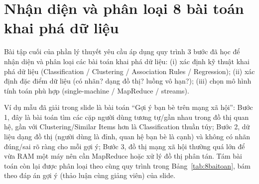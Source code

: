 \documentclass[12pt,a4paper,oneside]{article}
\begin{document}
\section{Nhận diện và phân loại 8 bài toán khai phá dữ liệu}
\label{sec:8baitoan}

Bài tập cuối của phần lý thuyết yêu cầu áp dụng quy trình 3 bước đã học để nhận diện và phân loại các bài toán khai phá dữ liệu: (i) xác định kỹ thuật khai phá dữ liệu (Classification / Clustering / Association Rules / Regression); (ii) xác định đặc điểm dữ liệu (có nhãn? dạng đồ thị? luồng vô hạn?); (iii) chọn mô hình tính toán phù hợp (single-machine / MapReduce / streams).

Ví dụ mẫu đã giải trong slide là bài toán ``Gợi ý bạn bè trên mạng xã hội'': Bước 1, đây là bài toán tìm các cặp người dùng tương tự/gần nhau trong đồ thị quan hệ, gần với Clustering/Similar Items hơn là Classification thuần túy; Bước 2, dữ liệu dạng đồ thị (người dùng là đỉnh, quan hệ bạn bè là cạnh) và không có nhãn đúng/sai rõ ràng cho mỗi gợi ý; Bước 3, đồ thị mạng xã hội thường quá lớn để vừa RAM một máy nên cần MapReduce hoặc xử lý đồ thị phân tán. Tám bài toán còn lại được phân loại theo cùng quy trình trong Bảng~\ref{tab:8baitoan}, bám theo đáp án gợi ý (thảo luận cùng giảng viên) của slide.
\end{document}
